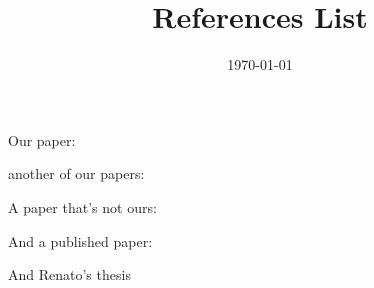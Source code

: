 \documentclass[a4paper,12pt]{article}
\begin{document}
\title{References List}
\author{}
\date{\today}
\maketitle

Our paper: \cite{1211.1037}

another of our papers: \cite{1211.3141}

A paper that's not ours: \cite{1306.0516}

And a published paper: \cite{1009.1630}

And Renato's thesis~\cite{quant-ph/0512258}


\nocite{*}


\end{document}
